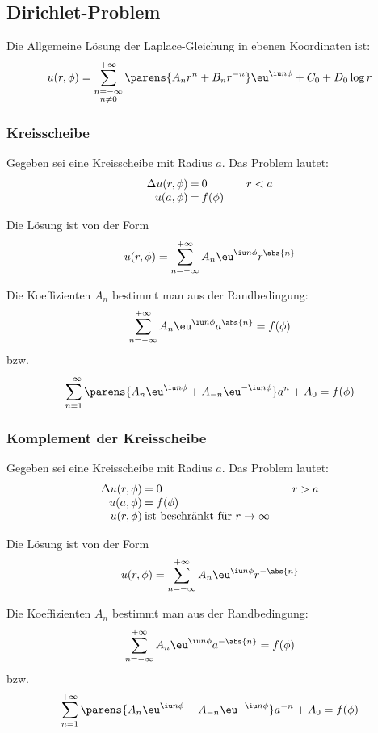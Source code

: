 	\subsection{Dirichlet-Problem} %
		Die Allgemeine Lösung der Laplace-Gleichung in ebenen Koordinaten ist:
		\[
			u(r,\phi) = \sum_{\substack{n=-\infty\\ n\neq 0}}^{+\infty} \parens{
				A_n r^n + B_n r^{-n}
			} \eu^{\iu n \phi} + C_0 + D_0 \log r
		\]
		\subsubsection{Kreisscheibe} %
			Gegeben sei eine Kreisscheibe mit Radius $a$.
			Das Problem lautet:
			\begin{equation*}
				\begin{array}{r@{\:=\:}l@{\qquad}l}
					\Delta u(r,\phi) & 0 & r < a \\
					u(a,\phi) & f(\phi) & 
				\end{array}
			\end{equation*}

			Die Lösung ist von der Form
			\[
				u(r,\phi) = \sum_{n=-\infty}^{+\infty} A_n \eu^{\iu n \phi} r^{\abs{n}}
			\]

			Die Koeffizienten $A_n$ bestimmt man aus der Randbedingung:
			\[
				\sum_{n=-\infty}^{+\infty} A_n \eu^{\iu n \phi} a^{\abs{n}} = f(\phi)
			\]
			bzw.
			\[
				\sum_{n=1}^{+\infty} \parens{
					A_n \eu^{\iu n \phi} + A_{-n} \eu^{-\iu n \phi}
				} a^n + A_0 = f(\phi)
			\]
		\subsubsection{Komplement der Kreisscheibe} %
			Gegeben sei eine Kreisscheibe mit Radius $a$.
			Das Problem lautet:
			\begin{equation*}
				\begin{array}{r@{\:}l@{\qquad}l}
					\Delta u (r,\phi) &= 0 & r > a \\
					u(a,\phi) &= f(\phi) \\
					u(r,\phi) &\text{ist beschränkt für $r\to\infty$}
				\end{array}
			\end{equation*}
			
			Die Lösung ist von der Form
			\[
				u(r,\phi) = \sum_{n=-\infty}^{+\infty} A_n \eu^{\iu n \phi} r^{-\abs{n}}
			\]

			Die Koeffizienten $A_n$ bestimmt man aus der Randbedingung:
			\[
				\sum_{n=-\infty}^{+\infty} A_n \eu^{\iu n \phi} a^{-\abs{n}} = f(\phi)
			\]
			bzw.
			\[
				\sum_{n=1}^{+\infty} \parens{
					A_n \eu^{\iu n \phi} + A_{-n} \eu^{-\iu n \phi}
				} a^{-n} + A_0 = f(\phi)
			\]
